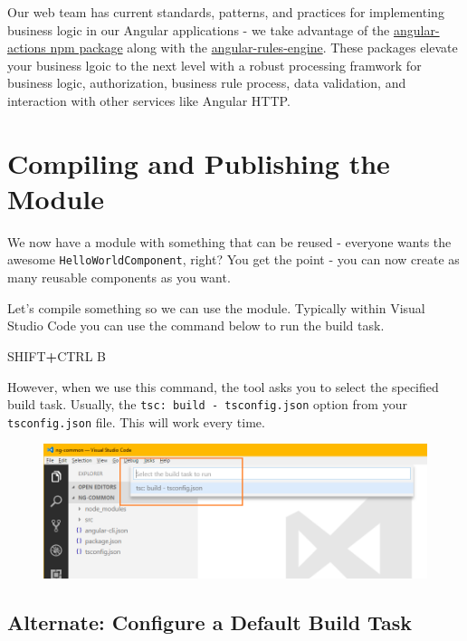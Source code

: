 \documentclass[]{book}
\newenvironment{Shaded}{\begin{snugshade}}{\end{snugshade}}
\newcommand{\OperatorTok}[1]{\textcolor[rgb]{0.81,0.36,0.00}{\textbf{#1}}}
\newcommand{\NormalTok}[1]{#1}
\theoremstyle{definition}
\theoremstyle{definition}
\theoremstyle{definition}
\theoremstyle{remark}
\begin{document}
Our web team has current standards, patterns, and practices for
implementing business logic in our Angular applications - we take
advantage of the
\href{https://www.npmjs.com/package/angular-actions}{angular-actions npm
package} along with the
\href{https://www.npmjs.com/package/angular-rules-engine}{angular-rules-engine}.
These packages elevate your business lgoic to the next level with a
robust processing framwork for business logic, authorization, business
rule process, data validation, and interaction with other services like
Angular HTTP.

\chapter{Compiling and Publishing the
Module}\label{compiling-and-publishing-the-module}

We now have a module with something that can be reused - everyone wants
the awesome \texttt{HelloWorldComponent}, right? You get the point - you
can now create as many reusable components as you want.

Let's compile something so we can use the module. Typically within
Visual Studio Code you can use the command below to run the build task.

\begin{Shaded}
\begin{Highlighting}[]
\NormalTok{SHIFT}\OperatorTok{+}\NormalTok{CTRL B}
\end{Highlighting}
\end{Shaded}

However, when we use this command, the tool asks you to select the
specified build task. Usually, the
\texttt{tsc:\ build\ -\ tsconfig.json} option from your
\texttt{tsconfig.json} file. This will work every time.

\begin{figure}
\centering
\includegraphics{images/select-build-task.png}
\caption{}
\end{figure}

\section{Alternate: Configure a Default Build
Task}\label{alternate-configure-a-default-build-task}
\end{document}
